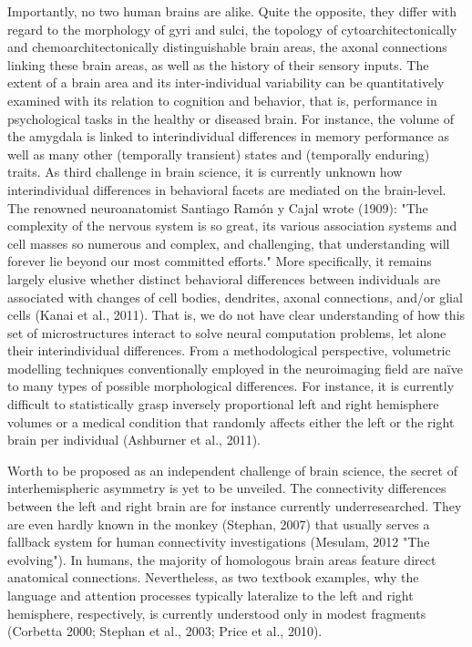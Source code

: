 \documentclass[authoryear,review,3p]{elsarticle}
\begin{document}
Importantly,
no two human brains are alike.
Quite the opposite,
they differ with regard to
the morphology of gyri and sulci,
the topology of cytoarchitectonically and chemoarchitectonically
distinguishable brain areas,
the axonal connections linking these brain areas,
as well as the history of their sensory inputs.
%
The extent of a brain area and its inter-individual variability
can be quantitatively examined with its relation to cognition and behavior,
that is,
performance in psychological tasks in the healthy or diseased brain.
For instance, the volume of the amygdala is linked to
interindividual differences in memory performance as well as
many other (temporally transient) states and
(temporally enduring) traits.
%
As third challenge in brain science,
it is currently unknown how interindividual differences
in behavioral facets are mediated on the brain-level.
%
The renowned neuroanatomist Santiago Ram\'{o}n y Cajal wrote (1909):
"The complexity of the nervous system is so great,
its various association systems and cell masses so numerous and
complex, and challenging,
that understanding will forever lie beyond our most committed efforts."
%
More specifically, it remains largely elusive
whether distinct behavioral differences
between individuals are associated with changes of
cell bodies, dendrites, axonal connections, and/or glial cells
(Kanai et al., 2011).
That is,
we do not have clear understanding of how
this set of microstructures interact to
solve neural computation problems,
let alone their interindividual differences.
%
From a methodological perspective,
volumetric modelling techniques
conventionally employed in the neuroimaging field
are na\"ive to
many types of possible morphological differences.
For instance,
it is currently difficult to statistically grasp
inversely proportional left and right hemisphere volumes
or
a medical condition that randomly
affects either the left or the right brain
per individual
(Ashburner et al., 2011).


Worth to be proposed as an independent challenge of
brain science, the secret of interhemispheric
asymmetry is yet to be unveiled.
The connectivity differences between the left and right brain are
for instance currently underresearched.
They are even hardly known in the monkey (Stephan, 2007)
that usually serves a fallback system for human
connectivity investigations (Mesulam, 2012 "The evolving").
In humans, the majority of homologous brain areas feature
direct anatomical connections.
Nevertheless, as two textbook examples,
why the language and attention processes typically lateralize to
the left and right hemisphere, respectively,
is currently understood only in modest fragments
(Corbetta 2000; Stephan et al., 2003; Price et al., 2010).
\end{document}
